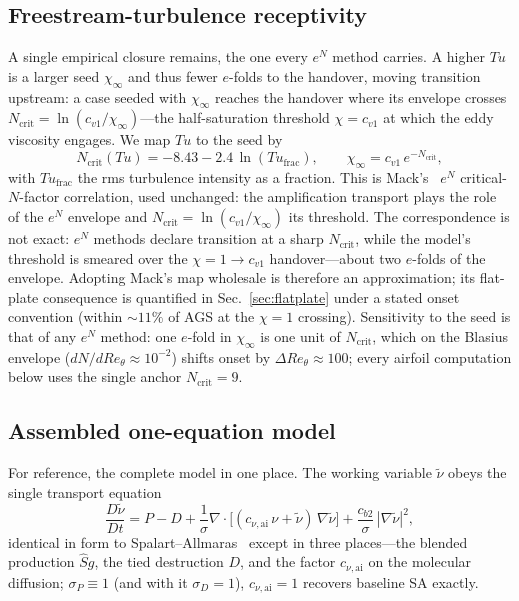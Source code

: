 \documentclass[journal]{new-aiaa}
\begin{document}
\subsection{Freestream-turbulence receptivity}\label{sec:calib_tu}

A single empirical closure remains, the one every $e^N$ method carries. A higher
$Tu$ is a larger seed
$\chi_\infty$ and thus fewer $e$-folds to the handover, moving transition
upstream: a case seeded with $\chi_\infty$ reaches the handover where
its envelope crosses
$N_\mathrm{crit}\!=\!\ln(c_{v1}/\chi_\infty)$---the half-saturation
threshold $\chi\!=\!c_{v1}$ at which the eddy viscosity engages. We map
$Tu$ to the seed
by
\begin{equation}
  N_\mathrm{crit}(Tu) = -8.43 - 2.4\,\ln(Tu_{\mathrm{frac}}),
  \qquad
  \chi_\infty = c_{v1}\,e^{-N_\mathrm{crit}},
  \label{eq:tumap}
\end{equation}
with $Tu_{\mathrm{frac}}$ the rms turbulence intensity as a fraction. This is
Mack's~\cite{mack_1977, nasa_tmr} $e^N$ critical-$N$-factor correlation,
used unchanged: the
amplification transport plays the role of the $e^N$ envelope and
$N_\mathrm{crit}=\ln(c_{v1}/\chi_\infty)$ its threshold. The
correspondence is not exact: $e^N$ methods
declare transition at a sharp $N_\mathrm{crit}$, while the model's
threshold is smeared over the $\chi\!=\!1\!\to\!c_{v1}$
handover---about two $e$-folds of the envelope. Adopting Mack's map
wholesale is therefore an approximation; its flat-plate consequence is
quantified in Sec.~\ref{sec:flatplate} under a stated onset convention
(within $\sim\!11\%$ of AGS at the $\chi\!=\!1$ crossing).
Sensitivity to the seed is that of any $e^N$ method: one $e$-fold in
$\chi_\infty$ is one unit of $N_\mathrm{crit}$, which on the Blasius envelope
($dN/dRe_\theta\!\approx\!10^{-2}$) shifts onset by
$\Delta Re_\theta\!\approx\!100$; every airfoil computation below uses the
single anchor $N_\mathrm{crit}\!=\!9$.

\subsection{Assembled one-equation model}\label{sec:assembled}

For reference, the complete model in one place. The working variable
$\tilde\nu$ obeys the single transport equation
\begin{equation}
  \frac{D\tilde\nu}{Dt} = P - D
  + \frac{1}{\sigma}\nabla\!\cdot\!\big[(c_{\nu,\mathrm{ai}}\,\nu+\tilde\nu)\,\nabla\tilde\nu\big]
  + \frac{c_{b2}}{\sigma}\,|\nabla\tilde\nu|^2,
  \label{eq:aisa}
\end{equation}
identical in form to Spalart--Allmaras~\cite{spalart_allmaras_1992} except in
three places---the blended production $\hat S g$, the tied destruction $D$, and the
factor $c_{\nu,\mathrm{ai}}$ on the molecular diffusion;
$\sigma_P\!\equiv\!1$ (and with it $\sigma_D\!=\!1$),
$c_{\nu,\mathrm{ai}}\!=\!1$ recovers baseline SA exactly.
\end{document}
